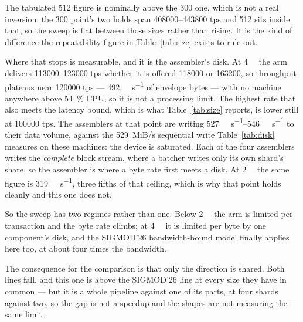 \documentclass[10pt,twocolumn]{article}
\begin{document}
The tabulated \SI{512}{\byte} figure is nominally above the \SI{300}{\byte} one, which is not a real
inversion: the \SI{300}{\byte} point's two holds span \numrange{408000}{443800} tps and
\SI{512}{\byte} sits inside that, so the sweep is flat between those sizes rather than rising. It is
the kind of difference the repeatability figure in Table~\ref{tab:size} exists to rule out.

Where that stops is measurable, and it is the assembler's disk. At \SI{4}{\kibi\byte} the arm delivers
\SIrange{113000}{123000}{} tps whether it is offered \num{118000} or \num{163200}, so throughput
plateaus near \num{120000} tps --- \SI{492}{\mega\byte\per\second} of envelope bytes --- with no
machine anywhere above \SI{54}{\percent} CPU, so it is not a processing limit. The highest rate that
also meets the latency bound, which is what Table~\ref{tab:size} reports, is lower still at
\num{100000} tps. The
assemblers at that point are writing \SIrange{527}{546}{\mega\byte\per\second} to their data
volume, against the \SI{529}{MiB/s} sequential write Table~\ref{tab:disk} measures on these
machines: the device is saturated. Each of the four assemblers writes the \emph{complete} block
stream, where a batcher writes only its own shard's share, so the assembler is where a byte rate
first meets a disk. At \SI{2}{\kibi\byte} the same figure is \SI{319}{\mega\byte\per\second},
three fifths of that ceiling, which is why that point holds cleanly and this one does not.

So the sweep has two regimes rather than one. Below \SI{2}{\kibi\byte} the arm is limited per
transaction and the byte rate climbs; at \SI{4}{\kibi\byte} it is limited per byte by one
component's disk, and the SIGMOD'26 bandwidth-bound model finally applies here too, at about four
times the bandwidth.

The consequence for the comparison is that only the direction is shared. Both lines fall, and this
one is above the SIGMOD'26 line at every size they have in common --- but it is a whole pipeline
against one of its parts, at four shards against two, so the gap is not a speedup and the shapes are
not measuring the same limit.
\end{document}
